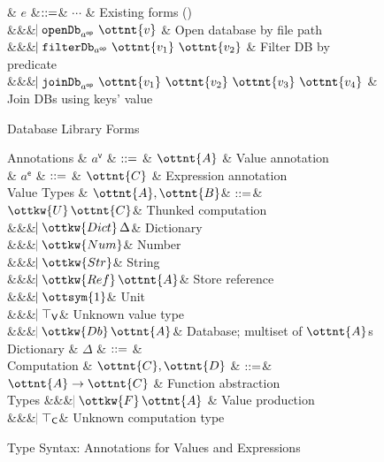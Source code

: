 \begin{figure}
  \begin{grammar}
  & $e$
    &$\mathrel{::=}$& $\cdots$ & Existing forms ()
    \\ &&& $\bnfaltbrk  \texttt{openDb}_{ a^{\textsf{op} } }~ \ottnt{v} $ & Open database by file path
    \\ &&& $\bnfaltbrk  \texttt{filterDb}_{ a^{\textsf{op} } }~ \ottnt{v_{{\mathrm{1}}}} ~ \ottnt{v_{{\mathrm{2}}}} $ & Filter DB by predicate
    \\ &&& $\bnfaltbrk  \texttt{joinDb}_{ a^{\textsf{op} } }~ \ottnt{v_{{\mathrm{1}}}} ~ \ottnt{v_{{\mathrm{2}}}} ~ \ottnt{v_{{\mathrm{3}}}} ~ \ottnt{v_{{\mathrm{4}}}} $ & Join DBs using keys' value
\end{grammar}
\caption{Database Library Forms}
\label{fig:db-syntax}
\end{figure}


\begin{figure}
\begin{grammar}
  Annotations
    & $a^\textsf{v}$ & $\mathrel{::=}$ & $\ottnt{A}$ & Value annotation
  \\
    & $a^\textsf{e}$ & $\mathrel{::=}$ & $\ottnt{C}$ & Expression annotation
  \\
  Value Types  & $\ottnt{A}, \ottnt{B}$& $\mathrel{::=}$& 
  $ \ottkw{U} \, \ottnt{C}$& Thunked computation
  \\ &&& $\bnfaltbrk \ottkw{Dict} \, \Delta$& Dictionary
  \\ &&& $\bnfaltbrk \ottkw{Num}$& Number
  \\ &&& $\bnfaltbrk \ottkw{Str}$& String
  \\ &&& $\bnfaltbrk \ottkw{Ref} \, \ottnt{A}$& Store reference
  \\ &&& $\bnfaltbrk \ottsym{1}$& Unit
  \\ &&& $\hspace{-1.02ex}\mathrel{\mid}  \top_\textsf{V} $& Unknown value type
  \\ &&& $\bnfaltbrk \ottkw{Db} \, \ottnt{A}$& Database; multiset of $\ottnt{A}$s
  \\[2mm]
  Dictionary & $\Delta$ & $\mathrel{::=}$ & 
  \\[2mm]
  Computation & $\ottnt{C}, \ottnt{D}$ & $\mathrel{::=}$& 
  $\ottnt{A}  \rightarrow  \ottnt{C}$ & Function abstraction
  \\ 
  Types
  &&& $\bnfaltbrk \ottkw{F} \, \ottnt{A}$ & Value production
  \\ &&& $\hspace{-1.02ex}\mathrel{\mid}  \top_\textsf{C} $& Unknown computation type
\end{grammar}
\caption{Type Syntax: Annotations for Values and Expressions}
\label{fig:types}
\end{figure}

